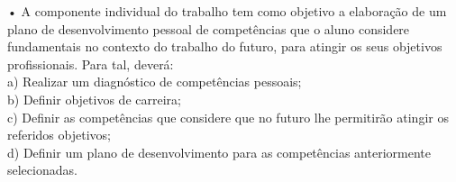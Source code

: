 • A componente individual do trabalho tem como objetivo a elaboração de um plano de desenvolvimento pessoal de competências que o aluno considere fundamentais no contexto do trabalho do futuro, para atingir os seus objetivos profissionais. Para tal, deverá:\\
a) Realizar um diagnóstico de competências pessoais;\\
b) Definir objetivos de carreira;\\
c) Definir as competências que considere que no futuro lhe permitirão atingir os referidos objetivos;\\
d) Definir um plano de desenvolvimento para as competências anteriormente selecionadas.\\

